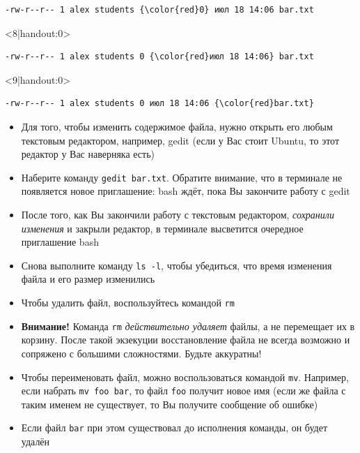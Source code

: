 \documentclass[handout]{beamer}
\begin{document}
\begin{frame}[fragile]
\begin{onlyenv}
\begin{Verbatim}[commandchars=\\\{\},codes={\catcode`$=3\catcode`^=7\catcode`_=8}]
-rw-r--r-- 1 alex students {\color{red}0} июл 18 14:06 bar.txt
		\end{Verbatim}
	\end{onlyenv}
	\begin{onlyenv}<8|handout:0>
		\begin{Verbatim}[commandchars=\\\{\},codes={\catcode`$=3\catcode`^=7\catcode`_=8}]
-rw-r--r-- 1 alex students 0 {\color{red}июл 18 14:06} bar.txt
		\end{Verbatim}
	\end{onlyenv}
	\begin{onlyenv}<9|handout:0>
		\begin{Verbatim}[commandchars=\\\{\},codes={\catcode`$=3\catcode`^=7\catcode`_=8}]
-rw-r--r-- 1 alex students 0 июл 18 14:06 {\color{red}bar.txt}
		\end{Verbatim}
	\end{onlyenv}
\end{frame}

\begin{frame}
	\begin{itemize}
		\item{Для того, чтобы изменить содержимое файла, нужно открыть его любым текстовым редактором, например, gedit (если у Вас стоит Ubuntu, то этот редактор у Вас наверняка есть)}\pause
		\item{Наберите команду \texttt{gedit bar.txt}. Обратите внимание, что в терминале не появляется новое приглашение: bash ждёт, пока Вы закончите работу с gedit}\pause
		\item{После того, как Вы закончили работу с текстовым редактором, \emph{сохранили изменения} и закрыли редактор, в терминале высветится очередное приглашение bash}\pause
		\item{Снова выполните команду \texttt{ls~-l}, чтобы убедиться, что время изменения файла и его размер изменились}
	\end{itemize}
\end{frame}

\begin{frame}
	\begin{itemize}
		\item{Чтобы удалить файл, воспользуйтесь командой \texttt{rm}}\pause
		\item{\textbf{Внимание!} Команда \texttt{rm} \emph{действительно удаляет} файлы, а не перемещает их в корзину. После такой экзекуции восстановление файла не всегда возможно и сопряжено с большими сложностями. Будьте аккуратны!}\pause
		\item{Чтобы переименовать файл, можно воспользоваться командой \texttt{mv}. Например, если набрать \texttt{mv~foo~bar}, то файл \texttt{foo} получит новое имя (если же файла с таким именем не существует, то Вы получите сообщение об ошибке)}\pause
		\item{Если файл \texttt{bar} при этом существовал до исполнения команды, он будет удалён}
	\end{itemize}
\end{frame}
\end{document}
